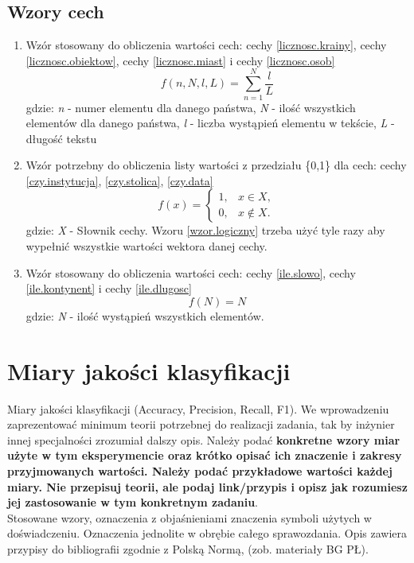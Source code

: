 \documentclass{article}
\begin{document}
\subsection{Wzory cech}
\begin{enumerate}
    \item Wzór stosowany do obliczenia wartości cech: cechy \ref{licznosc.krainy}, cechy \ref{licznosc.obiektow}, cechy \ref{licznosc.miast} i cechy \ref{licznosc.osob} 
    \begin{equation}
        f(n, N, l, L) = 
        \sum_{n=1}^{N} \frac{l}{L} 
    \end{equation}
    gdzie: \textit{n} - numer elementu dla danego państwa,  \textit{N} - ilość wszystkich elementów dla danego państwa, \textit{l} - liczba wystąpień elementu w tekście, \textit{L} - długość tekstu

    \item Wzór potrzebny do obliczenia listy wartości z przedziału \{0,1\} dla cech: cechy \ref{czy.instytucja}, \ref{czy.stolica}, \ref{czy.data}
    \begin{equation} \label{wzor.logiczny} 
        f(x) =
        \begin{cases} 
            1, & x \in X, \\
            0, & x \not \in X.
        \end{cases}
    \end{equation}
    gdzie: \textit{X} - Słownik cechy.
    Wzoru \ref{wzor.logiczny} trzeba użyć tyle razy aby wypełnić wszystkie wartości wektora danej cechy.

    \item Wzór stosowany do obliczenia wartości cech: cechy \ref{ile.slowo}, cechy \ref{ile.kontynent} i cechy \ref{ile.dlugosc}   
    \begin{equation}
        f(N) = N
    \end{equation}
    gdzie: \textit{N} - ilość wystąpień wszystkich elementów. 

\end{enumerate}



\section{Miary jakości klasyfikacji} 
Miary jakości klasyfikacji (Accuracy, Precision,
Recall, F1). We wprowadzeniu zaprezentować minimum teorii potrzebnej do realizacji
zadania, tak by inżynier innej specjalności zrozumiał dalszy opis. Należy podać {\bf konkretne wzory miar użyte w tym eksperymencie oraz krótko
opisać ich znaczenie i zakresy przyjmowanych wartości. Należy podać przykładowe
wartości każdej miary. Nie przepisuj
teorii, ale podaj link/przypis i opisz jak rozumiesz jej zastosowanie w tym konkretnym
zadaniu}. \\
\indent Stosowane wzory, oznaczenia z objaśnieniami znaczenia symboli użytych w
doświadczeniu. Oznaczenia jednolite w obrębie całego sprawozdania.  Opis zawiera przypisy do bibliografii zgodnie z
Polską Normą, (zob. materiały BG PŁ).\\
\end{document}
